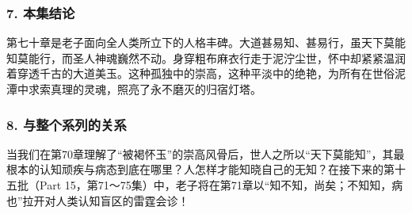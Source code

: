 \subsubsection{7. 本集结论}
第七十章是老子面向全人类所立下的人格丰碑。大道甚易知、甚易行，虽天下莫能知莫能行，而圣人神魂巍然不动。身穿粗布麻衣行走于泥泞尘世，怀中却紧紧温润着穿透千古的大道美玉。这种孤独中的崇高，这种平淡中的绝艳，为所有在世俗泥潭中求索真理的灵魂，照亮了永不磨灭的归宿灯塔。

\subsubsection{8. 与整个系列的关系}
当我们在第70章理解了“被褐怀玉”的崇高风骨后，世人之所以“天下莫能知”，其最根本的认知顽疾与病态到底在哪里？人怎样才能知晓自己的无知？在接下来的第十五批（Part 15，第71～75集）中，老子将在第71章以“知不知，尚矣；不知知，病也”拉开对人类认知盲区的雷霆会诊！